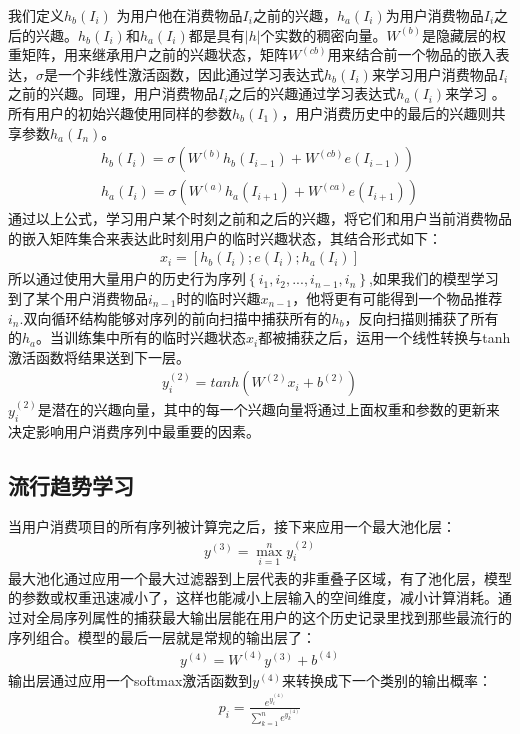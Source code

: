 我们定义$h_{b}(I_{i})$ 为用户他在消费物品$I_i$之前的兴趣，$h_{a}(I_{i})$为用户消费物品$I_i$之后的兴趣。$h_{b}(I_{i})$和$h_{a}(I_{i})$都是具有$|h|$个实数的稠密向量。$W^{(b)}$是隐藏层的权重矩阵，用来继承用户之前的兴趣状态，矩阵$W^{(cb)}$用来结合前一个物品的嵌入表达，$\sigma$是一个非线性激活函数，因此通过学习表达式$h_{b}(I_{i})$来学习用户消费物品$I_i$之前的兴趣。同理，用户消费物品$I_i$之后的兴趣通过学习表达式$h_{a}(I_{i})$来学习
。所有用户的初始兴趣使用同样的参数$h_{b}(I_{1})$，用户消费历史中的最后的兴趣则共享参数$h_{a}(I_{n})$。
\begin{align}
h_{b}(I_{i})=\sigma (W^{(b)}h_{b}(I_{i-1})+W^{(cb)}e(I_{i-1})) \\
h_{a}(I_{i})=\sigma (W^{(a)}h_{a}(I_{i+1})+W^{(ca)}e(I_{i+1}))
\end{align}
通过以上公式，学习用户某个时刻之前和之后的兴趣，将它们和用户当前消费物品的嵌入矩阵集合来表达此时刻用户的临时兴趣状态，其结合形式如下：
\begin{align}
x_{i}=[h_{b}(I_{i});e(I_{i});h_{a}(I_{i})]
\end{align}
所以通过使用大量用户的历史行为序列$\left \{ i_{1},i_{2},...,i_{n-1},i_{n} \right \}$,如果我们的模型学习到了某个用户消费物品$i_{n-1}$时的临时兴趣$x_{n-1}$，他将更有可能得到一个物品推荐$i_{n}$.双向循环结构能够对序列的前向扫描中捕获所有的$h_b$，反向扫描则捕获了所有的$h_a$。当训练集中所有的临时兴趣状态$x_i$都被捕获之后，运用一个线性转换与tanh激活函数将结果送到下一层。
\begin{align}
y_{i}^{(2)}=tanh(W^{(2)}x_{i}+b^{(2)})
\end{align}
$y_{i}^{(2)}$是潜在的兴趣向量，其中的每一个兴趣向量将通过上面权重和参数的更新来决定影响用户消费序列中最重要的因素。

\subsection{流行趋势学习}
当用户消费项目的所有序列被计算完之后，接下来应用一个最大池化层：
\begin{align}
y^{(3)}=\max_{i=1}^{n}y_{i}^{(2)}
\end{align}
最大池化通过应用一个最大过滤器到上层代表的非重叠子区域，有了池化层，模型的参数或权重迅速减小了，这样也能减小上层输入的空间维度，减小计算消耗。通过对全局序列属性的捕获最大输出层能在用户的这个历史记录里找到那些最流行的序列组合。模型的最后一层就是常规的输出层了：
\begin{align}
y^{(4)}=W^{(4)}y^{(3)}+b^{(4)}
\end{align}
输出层通过应用一个softmax激活函数到$y^{(4)}$来转换成下一个类别的输出概率：
\begin{align}
p_{i}= \frac{e^{y_{i}^{(4)}}}{\sum_{k=1}^{n}e^{y_{k}^{(4)}}}
\end{align}

